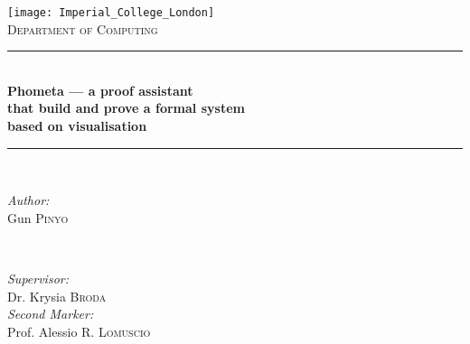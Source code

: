 \begin{titlepage}

\newcommand{\HRule}{\rule{\linewidth}{0.5mm}} %

\center %


\texttt{[image: Imperial\_College\_London]}\\[1cm] %

\textsc{\LARGE Department of Computing}\\[2cm] %


\HRule \\[0.4cm]
{ \huge \bfseries Phometa --- a proof assistant }\\[0.4cm] %
{ \huge \bfseries that build and prove a formal system }\\[0.4cm] %
{ \huge \bfseries based on visualisation }\\[0.4cm] %
\HRule \\[1.5cm]


\begin{minipage}{0.3\textwidth}
\begin{flushleft} \Large
\emph{Author:}\\
Gun \textsc{Pinyo} %
\end{flushleft}
\end{minipage}
~
\begin{minipage}{0.5\textwidth}
\begin{flushright} \Large
\emph{Supervisor:} \\
Dr. Krysia \textsc{Broda} \\ [0.5cm] %
\emph{Second Marker:} \\
Prof. Alessio \textsc{R. Lomuscio} \\ %
\end{flushright}
\end{minipage}\\[2cm]


\end{titlepage}

